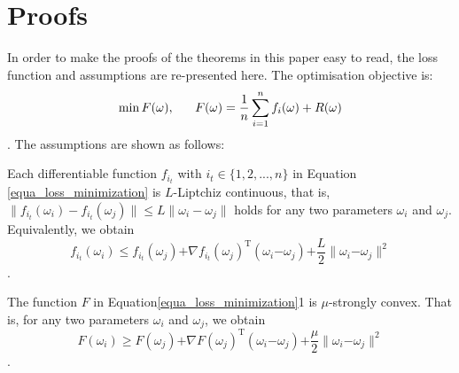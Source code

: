 \documentclass[letterpaper]{article}
\begin{document}
\section{Proofs}
\label{sect_proofs}
In order to make the proofs of the theorems in this paper easy to read, the  loss function and assumptions are re-presented here. The optimisation objective is:
\begin{equation}
\label{equa_loss_minimization}
\min F(\omega),~~~~~F(\omega)=\frac{1}{n}\sum\limits_{i=1}^n f_i(\omega)+R(\omega)\\
\end{equation}. The assumptions are shown as follows:


\begin{Assumption}
\label{assumption_liptchiz}
Each  differentiable function $f_{i_t}$ with $i_t\in\{1,2, ..., n\}$ in Equation \ref{equa_loss_minimization} is $L$-Liptchiz continuous, that is,  $\parallel  f_{i_t}(\omega_i) - f_{i_t}(\omega_j)  \parallel \le L \parallel \omega_i - \omega_j    \parallel$ holds for any two parameters $\omega_i$ and $\omega_j$. Equivalently, we obtain
$$
f_{i_t}(\omega_i)\le f_{i_t}(\omega_j)\mathrm{+}\nabla f_{i_t}(\omega_j)^\mathrm{T} (\omega_i\mathrm{-}\omega_j)\mathrm{+}\frac{L}{2}\parallel \omega_i\mathrm{-}\omega_j\parallel^2
$$.
\end{Assumption}

\begin{Assumption}
\label{assumption_strongly_convex}
The function $F$ in Equation\ref{equa_loss_minimization}1 is $\mu$-strongly convex. That is, for any two parameters $\omega_i$ and $\omega_j$, we obtain 
$$
F(\omega_i)\ge F(\omega_j)\mathrm{+}\nabla F(\omega_j)^\mathrm{T} (\omega_i\mathrm{-}\omega_j)\mathrm{+}\frac{\mu}{2}\parallel \omega_i\mathrm{-}\omega_j\parallel^2 
$$.
\end{Assumption} 
\end{document}
